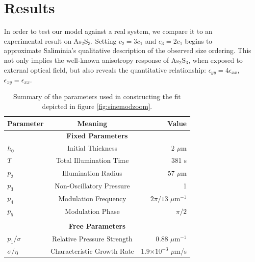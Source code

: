 \documentclass[aps, prl, twocolumn, groupedaddress]{revtex4-1}
\begin{document}
\section{Results}
In order to test our model against a real system, we compare it to an
experimental result on As$_2$S$_3$\cite{saliminia}. Setting $c_2 =
3c_1$ and $c_3 = 2c_1$ begins to approximate Saliminia's qualitative
description of the observed size ordering. This not only implies the
well-known anisotropy response of As$_2$S$_3$, when exposed to
external optical field, but also reveals the quantitative
relationship: $\epsilon_{yy} = 4\epsilon_{xx}$, $\epsilon_{xy} =
\epsilon_{xx}$.


\begin{table}
  \begin{ruledtabular}
    \begin{tabular}{l c r}
      \textbf{Parameter}&\textbf{Meaning}&\textbf{Value}\\
      \hline
      \multicolumn{3}{c}{\textbf{Fixed Parameters}}\\
      $h_0$& Initial Thickness&2 $\mu$m\\
      $T$& Total Illumination Time&381 s\\
      $p_2$&Illumination Radius&57 $\mu$m\\
      $p_3$&Non-Oscillatory Pressure&1\\
      $p_4$&Modulation Frequency&$2\pi/13$ $\mu$m$^{-1}$\\
      $p_5$&Modulation Phase&$\pi/2$\\
      \\
      \multicolumn{3}{c}{\textbf{Free Parameters}}\\
      $p_1/\sigma$&Relative Pressure Strength&0.88 $\mu$m$^{-1}$\\
      $\sigma/\eta$&Characteristic Growth Rate&1.9$\times 10^{-3}$ $\mu$m/s\\
    \end{tabular}
  \end{ruledtabular}
  \caption{Summary of the parameters used in constructing the fit depicted in figure
\ref{fig:sinemodzoom}.} \label{tab:sinemod}
\end{table}
\end{document}
